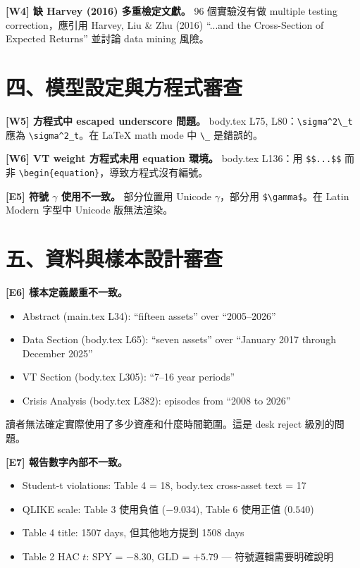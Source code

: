 \documentclass[12pt,a4paper]{article}
\begin{document}
\textcolor{warncolor}{\textbf{[W4] 缺 Harvey (2016) 多重檢定文獻。}} 96 個實驗沒有做 multiple testing correction，應引用 Harvey, Liu \& Zhu (2016) ``...and the Cross-Section of Expected Returns'' 並討論 data mining 風險。

\section*{四、模型設定與方程式審查}

\textcolor{warncolor}{\textbf{[W5] 方程式中 escaped underscore 問題。}} body.tex L75, L80：\verb|\sigma^2\_t| 應為 \verb|\sigma^2_t|。在 LaTeX math mode 中 \verb|\_| 是錯誤的。

\textcolor{warncolor}{\textbf{[W6] VT weight 方程式未用 equation 環境。}} body.tex L136：用 \verb|$$...$$| 而非 \verb|\begin{equation}|，導致方程式沒有編號。

\textcolor{errorred}{\textbf{[E5] 符號 $\gamma$ 使用不一致。}} 部分位置用 Unicode $\gamma$，部分用 \verb|$\gamma$|。在 Latin Modern 字型中 Unicode 版無法渲染。

\section*{五、資料與樣本設計審查}

\textcolor{errorred}{\textbf{[E6] 樣本定義嚴重不一致。}}

\begin{itemize}[nosep]
\item Abstract (main.tex L34): ``fifteen assets'' over ``2005--2026''
\item Data Section (body.tex L65): ``seven assets'' over ``January 2017 through December 2025''
\item VT Section (body.tex L305): ``7--16 year periods''
\item Crisis Analysis (body.tex L382): episodes from ``2008 to 2026''
\end{itemize}

讀者無法確定實際使用了多少資產和什麼時間範圍。這是 desk reject 級別的問題。

\textcolor{errorred}{\textbf{[E7] 報告數字內部不一致。}}

\begin{itemize}[nosep]
\item Student-t violations: Table 4 = 18, body.tex cross-asset text = 17
\item QLIKE scale: Table 3 使用負值 ($-9.034$), Table 6 使用正值 ($0.540$)
\item Table 4 title: 1507 days, 但其他地方提到 1508 days
\item Table 2 HAC $t$: SPY = $-8.30$, GLD = $+5.79$ — 符號邏輯需要明確說明
\end{itemize}
\end{document}
